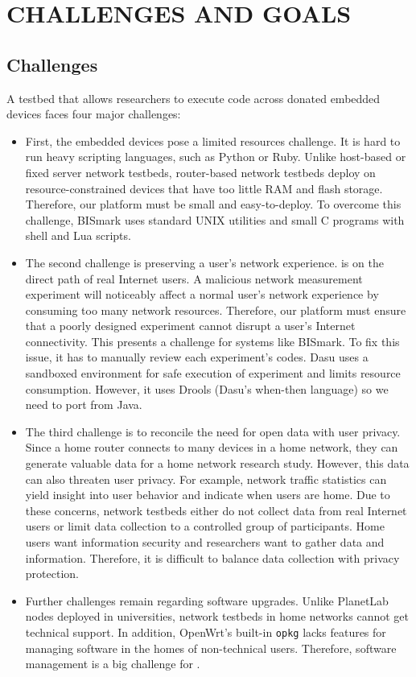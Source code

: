 \chapter{CHALLENGES AND GOALS}
\label{sec.goals_challenges}
\section{Challenges}
\label{ssec.challenges}
A testbed that allows researchers to execute code across donated embedded devices faces four major challenges: 
\begin{itemize}
\item First, the embedded devices pose a limited resources challenge. It is hard to run heavy scripting languages, such as Python or Ruby. Unlike host-based or fixed server network testbeds, router-based network testbeds deploy on resource-constrained devices that have too little RAM and flash storage. Therefore, our platform must be small and easy-to-deploy. To overcome this challenge, BISmark uses standard UNIX utilities and small C programs with shell and Lua scripts.  
\item The second challenge is preserving a user's network experience. \sysname is on the direct path of real Internet users. A malicious network measurement experiment will noticeably affect a normal user's network experience by consuming too many network resources. Therefore, our platform must ensure that a poorly designed experiment cannot disrupt a user's Internet connectivity. This presents a challenge for systems like BISmark. To fix this issue, it has to manually review each experiment's codes. Dasu uses a sandboxed environment for safe execution of experiment and limits resource consumption. However, it uses Drools (Dasu's when-then language) so we need to port from Java.
\item The third challenge is to reconcile the need for open data with user privacy. Since a home router connects to many devices in a home network, they can generate valuable data for a home network research study. However, this data can also threaten user privacy. For example, network traffic statistics can yield insight into user behavior and indicate when users are home. Due to these concerns, network testbeds either do not collect data from real Internet users or limit data collection to a controlled group of participants. Home users want information security and researchers want to gather data and information. Therefore, it is difficult to balance data collection with privacy protection.
\item Further challenges remain regarding software upgrades. Unlike PlanetLab nodes deployed in universities, network testbeds in home networks cannot get technical support. In addition, OpenWrt's built-in \texttt{opkg} lacks features for managing software in the homes of non-technical users. Therefore, software management is a big challenge for \sysname.  
\end{itemize}
